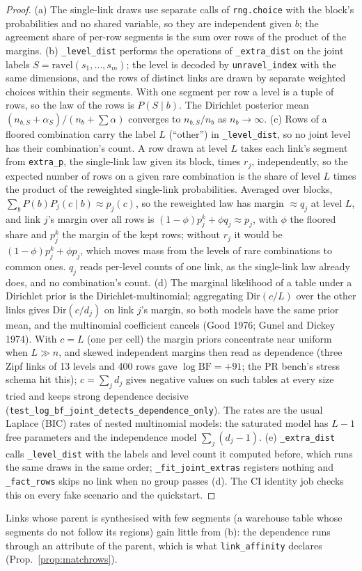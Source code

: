 \begin{proof}
(a) The single-link draws use separate calls of \texttt{rng.choice} with the block's probabilities and no shared variable, so they are independent given $b$; the agreement share of per-row segments is the sum over rows of the product of the margins. (b) \texttt{\_level\_dist} performs the operations of \texttt{\_extra\_dist} on the joint labels $S=\mathrm{ravel}(s_1,\dots,s_m)$; the level is decoded by \texttt{unravel\_index} with the same dimensions, and the rows of distinct links are drawn by separate weighted choices within their segments. With one segment per row a level is a tuple of rows, so the law of the rows is $P(S\mid b)$. The Dirichlet posterior mean $(n_{b,S}+\alpha_S)/(n_b+\sum\alpha)$ converges to $n_{b,S}/n_b$ as $n_b\to\infty$. (c) Rows of a floored combination carry the label $L$ (``other'') in \texttt{\_level\_dist}, so no joint level has their combination's count. A row drawn at level $L$ takes each link's segment from \texttt{extra\_p}, the single-link law given its block, times $r_j$, independently, so the expected number of rows on a given rare combination is the share of level $L$ times the product of the reweighted single-link probabilities. Averaged over blocks, $\sum_bP(b)P_j(c\mid b)\approx p_j(c)$, so the reweighted law has margin $\approx q_j$ at level $L$, and link $j$'s margin over all rows is $(1-\phi)p^{k}_j+\phi q_j\approx p_j$, with $\phi$ the floored share and $p^k_j$ the margin of the kept rows; without $r_j$ it would be $(1-\phi)p^k_j+\phi p_j$, which moves mass from the levels of rare combinations to common ones. $q_j$ reads per-level counts of one link, as the single-link law already does, and no combination's count. (d) The marginal likelihood of a table under a Dirichlet prior is the Dirichlet-multinomial; aggregating $\mathrm{Dir}(c/L)$ over the other links gives $\mathrm{Dir}(c/d_j)$ on link $j$'s margin, so both models have the same prior mean, and the multinomial coefficient cancels (Good 1976; Gunel and Dickey 1974). With $c=L$ (one per cell) the margin priors concentrate near uniform when $L\gg n$, and skewed independent margins then read as dependence (three Zipf links of 13 levels and 400 rows gave $\log\mathrm{BF}=+91$; the PR bench's stress schema hit this); $c=\sum_j d_j$ gives negative values on such tables at every size tried and keeps strong dependence decisive (\texttt{test\_log\_bf\_joint\_detects\_dependence\_only}). The rates are the usual Laplace (BIC) rates of nested multinomial models: the saturated model has $L-1$ free parameters and the independence model $\sum_j(d_j-1)$. (e) \texttt{\_extra\_dist} calls \texttt{\_level\_dist} with the labels and level count it computed before, which runs the same draws in the same order; \texttt{\_fit\_joint\_extras} registers nothing and \texttt{\_fact\_rows} skips no link when no group passes (d). The CI identity job checks this on every fake scenario and the quickstart.
\end{proof}
\noindent Links whose parent is synthesised with few segments (a warehouse table whose segments do not follow its regions) gain little from (b): the dependence runs through an attribute of the parent, which is what \texttt{link\_affinity} declares (Prop.~\ref{prop:matchrows}).

